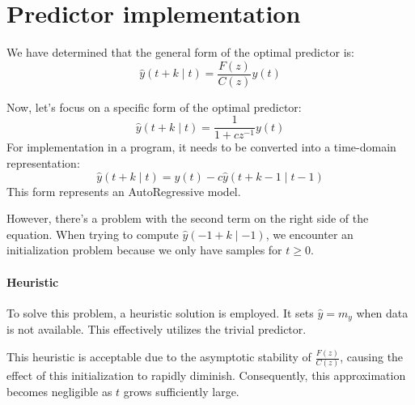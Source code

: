 \section{Predictor implementation}

We have determined that the general form of the optimal predictor is:
\[\hat{y}(t+k\mid t)=\dfrac{F(z)}{C(z)}y(t)\]

Now, let's focus on a specific form of the optimal predictor:
\[\hat{y}(t+k\mid t)=\dfrac{1}{1+cz^{-1}}y(t)\]
For implementation in a program, it needs to be converted into a time-domain representation:
\[\hat{y}(t+k\mid t)=y(t)-c\hat{y}(t+k-1\mid t-1) \]
This form represents an AutoRegressive model.

However, there's a problem with the second term on the right side of the equation.
When trying to compute $\hat{y}(-1+k\mid -1)$, we encounter an initialization problem because we only have samples for $t\geq 0$.

\paragraph*{Heuristic}
To solve this problem, a heuristic solution is employed. 
It sets $\hat{y}=m_y$ when data is not available. 
This effectively utilizes the trivial predictor.

This heuristic is acceptable due to the asymptotic stability of $\frac{F(z)}{C(z)}$, causing the effect of this initialization to rapidly diminish. 
Consequently, this approximation becomes negligible as $t$ grows sufficiently large.